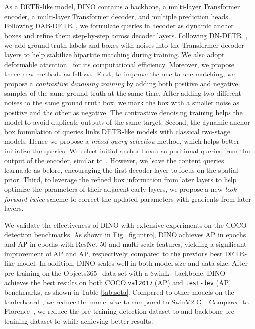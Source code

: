 \documentclass[runningheads]{llncs}
\newcommand{\modelname}{{DINO}}
\begin{document}
As a DETR-like model, {\modelname} contains a backbone, a multi-layer Transformer encoder, a multi-layer Transformer decoder, and multiple prediction heads. Following DAB-DETR~\cite{liu2022dab}, we formulate queries in decoder as dynamic anchor boxes and refine them step-by-step across decoder layers. Following DN-DETR~\cite{li2022dn}, we add ground truth labels and boxes with noises into the Transformer decoder layers to help stabilize bipartite matching during training. We also adopt deformable attention~\cite{zhu2020deformable} for its computational efficiency. Moreover, we propose three new methods as follows. 
First, to improve the one-to-one matching, we propose a \textit{contrastive denoising training} by adding both positive and negative samples of the same ground truth at the same time. After adding two different noises to the same ground truth box, we mark the box with a smaller noise as positive and the other as negative. The contrastive denoising training helps the model to avoid duplicate outputs of the same target. 
Second, the dynamic anchor box formulation of queries links DETR-like models with classical two-stage models. Hence we propose a \textit{mixed query selection} method, which helps better initialize the queries. We select initial anchor boxes as positional queries from the output of the encoder, similar to~\cite{zhu2020deformable,yao2021efficient}. However, we leave the content queries learnable as before, encouraging the first decoder layer to focus on the spatial prior. 
Third, to leverage the refined box information from later layers to help optimize the parameters of their adjacent early layers,
we propose a new \textit{look forward twice} scheme to correct the updated parameters with gradients from later layers.


We validate the effectiveness of DINO with extensive experiments on the COCO~\cite{lin2015microsoft} detection benchmarks. As shown in Fig. \ref{fig:intro}, DINO achieves AP in  epochs and AP in  epochs with ResNet-50 and multi-scale features, yielding a significant improvement of AP and AP, respectively, compared to the previous best DETR-like model.
In addition, DINO scales well in both model size and data size. After pre-training on the Objects365~\cite{shao2019objects365} data set with a  SwinL~\cite{liu2021swin} backbone, DINO achieves the best results on both COCO \texttt{val2017} (AP) and \texttt{test-dev} (AP) benchmarks, as shown in Table \ref{tab:sota}.
Compared to other models on the leaderboard \cite{paperwithcode}, we reduce the model size to  compared to SwinV2-G~\cite{liu2021swinv2}. Compared to Florence~\cite{yuan2021florence}, we reduce the pre-training detection dataset to  and backbone pre-training dataset to  while achieving better results.
\end{document}

